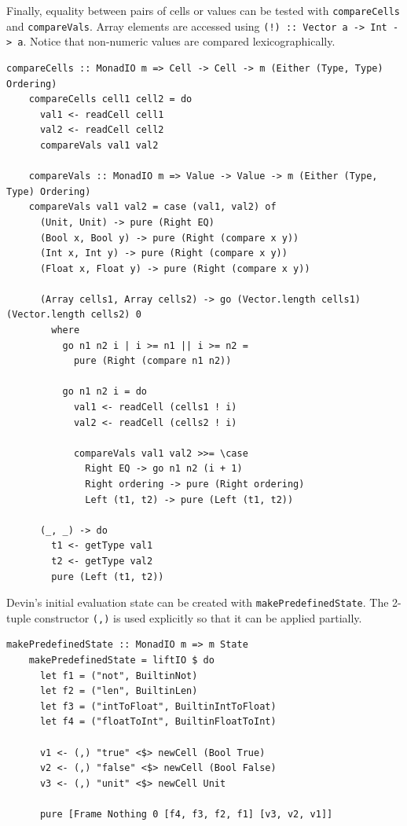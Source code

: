 \documentclass[UdineBachThesis,american,11pt]{PhdThesis}
\begin{document}
  \pagebreak

  Finally, equality between pairs of cells or values can be tested with
  \mbox{\texttt{compareCells}} and \mbox{\texttt{compareVals}}. Array elements
  are accessed using \mbox{\texttt{(!) :: Vector a -> Int -> a}}. Notice that
  non-numeric values are compared lexicographically.

  \begin{Verbatim}[gobble=4,fontsize=\small]
    compareCells :: MonadIO m => Cell -> Cell -> m (Either (Type, Type) Ordering)
    compareCells cell1 cell2 = do
      val1 <- readCell cell1
      val2 <- readCell cell2
      compareVals val1 val2

    compareVals :: MonadIO m => Value -> Value -> m (Either (Type, Type) Ordering)
    compareVals val1 val2 = case (val1, val2) of
      (Unit, Unit) -> pure (Right EQ)
      (Bool x, Bool y) -> pure (Right (compare x y))
      (Int x, Int y) -> pure (Right (compare x y))
      (Float x, Float y) -> pure (Right (compare x y))

      (Array cells1, Array cells2) -> go (Vector.length cells1) (Vector.length cells2) 0
        where
          go n1 n2 i | i >= n1 || i >= n2 =
            pure (Right (compare n1 n2))

          go n1 n2 i = do
            val1 <- readCell (cells1 ! i)
            val2 <- readCell (cells2 ! i)

            compareVals val1 val2 >>= \case
              Right EQ -> go n1 n2 (i + 1)
              Right ordering -> pure (Right ordering)
              Left (t1, t2) -> pure (Left (t1, t2))

      (_, _) -> do
        t1 <- getType val1
        t2 <- getType val2
        pure (Left (t1, t2))
  \end{Verbatim}

  Devin's initial evaluation state can be created with
  \mbox{\texttt{makePredefinedState}}. The 2-tuple constructor
  \mbox{\texttt{(,)}} is used explicitly so that it can be applied partially.

  \begin{Verbatim}[gobble=4,fontsize=\small]
    makePredefinedState :: MonadIO m => m State
    makePredefinedState = liftIO $ do
      let f1 = ("not", BuiltinNot)
      let f2 = ("len", BuiltinLen)
      let f3 = ("intToFloat", BuiltinIntToFloat)
      let f4 = ("floatToInt", BuiltinFloatToInt)

      v1 <- (,) "true" <$> newCell (Bool True)
      v2 <- (,) "false" <$> newCell (Bool False)
      v3 <- (,) "unit" <$> newCell Unit

      pure [Frame Nothing 0 [f4, f3, f2, f1] [v3, v2, v1]]
  \end{Verbatim}
\end{document}
